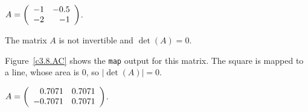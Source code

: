 \documentclass{ximera}
\begin{document}
\begin{exercise}  \label{c3.8.AC}
$A=\left(\begin{array}{rr} -1 & -0.5\\ -2 &-1\end{array}\right)$.

\begin{solution}
\ans The matrix $A$ is not invertible and $\det(A) = 0$.

\soln Figure~\ref{c3.8.AC} shows the {\tt map} output for this matrix.
The square is mapped to a line, whose area is $0$, so $|\det(A)| = 0$.


\end{solution}
\end{exercise}
\begin{exercise}  \label{c3.8.AD}
$A=\left(\begin{array}{rr} 0.7071 & 0.7071\\ -0.7071 &0.7071\end{array}\right)$.
\end{exercise}
\end{document}
